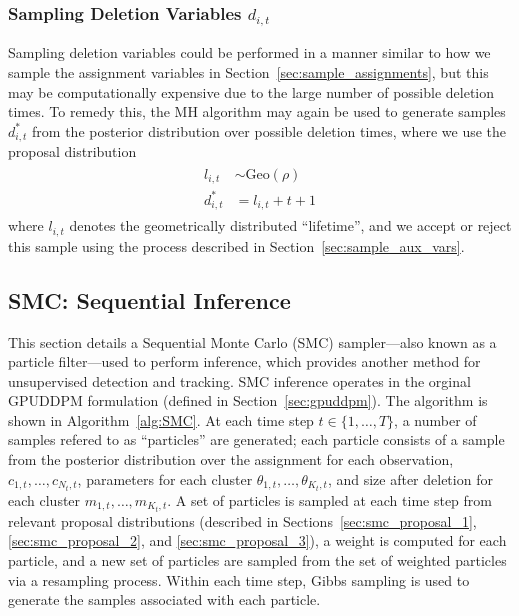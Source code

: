 \documentclass{article}
\begin{document}

\subsubsection{Sampling Deletion Variables $d_{i,t}$}
Sampling deletion variables could be performed in a manner similar to how we sample the assignment variables in Section~\ref{sec:sample_assignments}, but this may be computationally expensive due to the large number of possible deletion times. To remedy this, the MH algorithm may again be used to generate samples $d_{i,t}^{*}$ from the posterior distribution over possible deletion times, where we use the proposal distribution
\begin{align}
\begin{split}
l_{i,t}  &\sim  \text{Geo}(\rho)  \\
d_{i,t}^{*}  &= l_{i,t} + t + 1
\end{split}
\end{align}
where $l_{i,t}$ denotes the geometrically distributed ``lifetime'', and we accept or reject this sample using the process described in Section~\ref{sec:sample_aux_vars}.


\subsection{SMC: Sequential Inference}
\label{sec:SMC}

This section details a Sequential Monte Carlo (SMC) sampler---also known as a particle filter---used to perform inference, which provides another method for unsupervised detection and tracking. SMC inference operates in the orginal GPUDDPM formulation (defined in Section~\ref{sec:gpuddpm}). The algorithm is shown in Algorithm~\ref{alg:SMC}. At each time step $t \in \{ 1, \ldots, T \}$, a number of samples refered to as ``particles'' are generated; each particle consists of a sample from the posterior distribution over the assignment for each observation, $c_{1,t}, \ldots, c_{N_{t}, t}$, parameters for each cluster $\theta_{1,t}, \ldots, \theta_{K_{t}, t}$, and size after deletion for each cluster $m_{1,t}, \ldots, m_{K_{t},t}$. A set of particles is sampled at each time step from relevant proposal distributions (described in Sections~\ref{sec:smc_proposal_1}, \ref{sec:smc_proposal_2}, and \ref{sec:smc_proposal_3}), a weight is computed for each particle, and a new set of particles are sampled from the set of weighted particles via a resampling process. Within each time step, Gibbs sampling is used to generate the samples associated with each particle.
\end{document}
